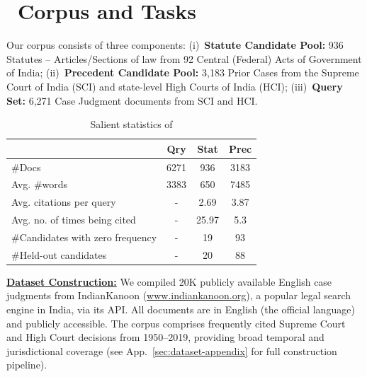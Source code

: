 \section{\ilpcsr\ Corpus and Tasks} \label{sec:dataset/overview}



Our corpus consists of three components:
(i)~{\bf Statute Candidate Pool:} 936 Statutes -- Articles/Sections of law from 92 Central (Federal) Acts of Government of India; 
(ii)~{\bf Precedent Candidate Pool:} 3,183 Prior Cases from the Supreme Court of India (SCI) and state-level High Courts of India (HCI);
(iii)~{\bf Query Set:} 6,271 Case Judgment documents from SCI and HCI. %

\begin{table}
    \small
    \centering
    \addtolength{\tabcolsep}{-0.1em}
    \begin{tabular}{p{}ccc}\toprule
         &  \textbf{Qry}&  \textbf{Stat} & \textbf{Prec}\\\midrule
         \#Docs & 6271 & 936 & 3183 \\
         Avg. \#words&  3383&  650& 7485\\
         Avg. citations per query&  -&  2.69& 3.87\\
         Avg. no. of times being cited &  -&  25.97& 5.3\\
         \#Candidates with zero frequency & - & 19 & 93 \\
         \#Held-out candidates & - & 20 & 88 \\
         \bottomrule
    \end{tabular}
    \vspace{-2mm}
    \caption{Salient statistics of \ilpcsr}
    \vspace{-5mm}
    \label{tab:salient-stats-ilpcsr}
\end{table}

\vspace{1mm}
\noindent\underline{\textbf{Dataset Construction:}} 
We compiled 20K publicly available English case judgments from IndianKanoon (\url{www.indiankanoon.org}), a popular legal search engine in India, via its API. All documents are in English (the official language) and publicly accessible. The corpus comprises frequently cited Supreme Court and High Court decisions from 1950–2019, providing broad temporal and jurisdictional coverage (see App.~\ref{sec:dataset-appendix} for full construction pipeline).

